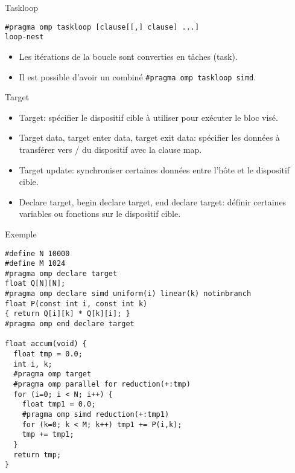 \documentclass[10pt]{beamer}
\begin{document}
\begin{frame}[fragile]{Taskloop}

  \begin{verbatim}
#pragma omp taskloop [clause[[,] clause] ...]
loop-nest
  \end{verbatim}
  \begin{itemize}
    \item Les itérations de la boucle sont converties en tâches (task).

    \item Il est possible d'avoir un combiné \verb|#pragma omp taskloop simd|.
  \end{itemize}
\end{frame}

\begin{frame}{Target}

  \begin{itemize}
    \item Target: spécifier le dispositif cible à utiliser pour exécuter le bloc visé.

    \item Target data, target enter data, target exit data: spécifier les données à transférer vers / du dispositif avec la clause map.

    \item Target update: synchroniser certaines données entre l'hôte et le dispositif cible.

    \item Declare target, begin declare target, end declare target: définir certaines variables ou fonctions sur le dispositif cible. 
  \end{itemize}
\end{frame}

\begin{frame}[fragile]{Exemple}

  \scriptsize
  \begin{verbatim}
#define N 10000
#define M 1024
#pragma omp declare target
float Q[N][N];
#pragma omp declare simd uniform(i) linear(k) notinbranch
float P(const int i, const int k) 
{ return Q[i][k] * Q[k][i]; }
#pragma omp end declare target

float accum(void) {
  float tmp = 0.0;
  int i, k;
  #pragma omp target
  #pragma omp parallel for reduction(+:tmp)
  for (i=0; i < N; i++) {
    float tmp1 = 0.0;
    #pragma omp simd reduction(+:tmp1)
    for (k=0; k < M; k++) tmp1 += P(i,k);
    tmp += tmp1;
  }
  return tmp;
}
  \end{verbatim}
\end{frame}
\end{document}
